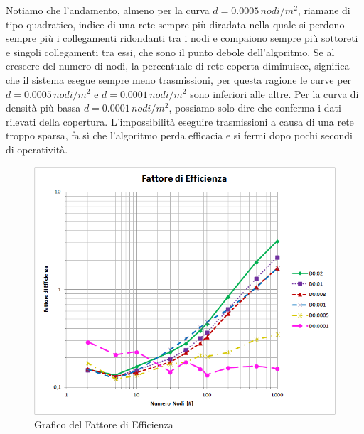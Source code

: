 Notiamo che l'andamento, almeno per la curva $d=0.0005\, nodi/m^2$, riamane di tipo quadratico, indice di una rete sempre più diradata nella quale si perdono sempre più i collegamenti ridondanti tra i nodi e compaiono sempre più sottoreti e singoli collegamenti tra essi, che sono il punto debole dell'algoritmo. Se al crescere del numero di nodi, la percentuale di rete coperta diminuisce, significa che il sistema esegue sempre meno trasmissioni, per questa ragione le curve per $d=0.0005\, nodi/m^2$ e $d=0.0001\, nodi/m^2$ sono inferiori alle altre. Per la curva di densità più bassa $d=0.0001\, nodi/m^2$, possiamo solo dire che conferma i dati rilevati della copertura. L'impossibilità eseguire trasmissioni a causa di una rete troppo sparsa, fa sì che l'algoritmo perda efficacia e si fermi dopo pochi secondi di operatività.

\begin{figure}[t]
	\centering
	\includegraphics[width=0.9\linewidth]{"Images/risultati/fattore di efficienza_log"}
	\caption[Fattore di Efficienza]{Grafico del Fattore di Efficienza}
	\label{fig:fattorediefficienza_log}
\end{figure}

